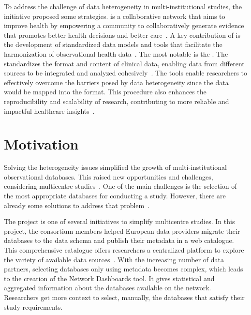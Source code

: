To address the challenge of data heterogeneity in multi-institutional studies, the {\ohdsi} initiative proposed some strategies. {\ohdsi} is a collaborative network that aims to improve health by empowering a community to collaboratively generate evidence that promotes better health decisions and better care~\cite{hripcsak2016characterizing}. A key contribution of {\ohdsi} is the development of standardized data models and tools that facilitate the harmonization of observational health data~\cite{park2023exploring}. The most notable is the {\omop}. The {\omop} standardizes the format and content of clinical data, enabling data from different sources to be integrated and analyzed cohesively~\cite{hripcsak2016characterizing,almeida2021two}. The {\ohdsi} tools enable researchers to effectively overcome the barriers posed by data heterogeneity since the data would be mapped into the {\omop} format. This procedure also enhances the reproducibility and scalability of research, contributing to more reliable and impactful healthcare insights~\cite{reich2024ohdsi}.


\section{Motivation}


Solving the heterogeneity issues simplified the growth of multi-institutional observational databases. This raised new opportunities and challenges, considering multicentre studies~\cite{almeida2023clinical}. One of the main challenges is the selection of the most appropriate databases for conducting a study. However, there are already some solutions to address that problem~\cite{almeida2024montra2}. 

The {\ehden}project is one of several initiatives to simplify multicentre studies. In this project, the consortium members helped European data providers migrate their databases to the {\omop} data schema and publish their metadata in a web catalogue. This comprehensive catalogue offers researchers a centralized platform to explore the variety of available data sources~\cite{almeida2023fair}. With the increasing number of data partners, selecting databases only using metadata becomes complex, which leads to the creation of the {\ehden} Network Dashboards tool. It gives statistical and aggregated information about the databases available on the network. Researchers get more context to select, manually, the databases that satisfy their study requirements.

